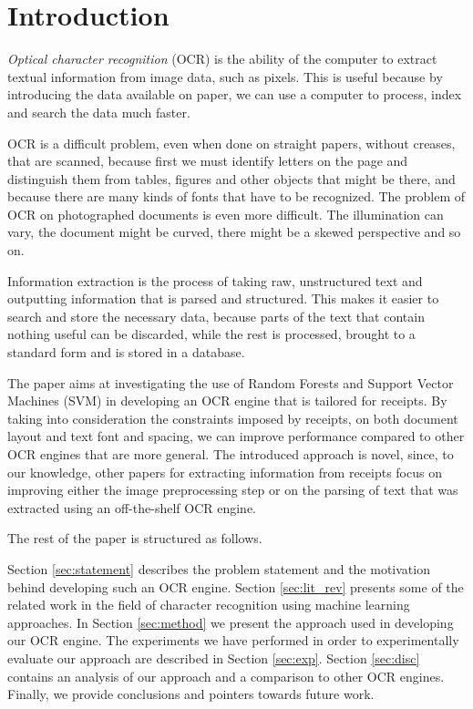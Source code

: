 \section{Introduction}
\textit{Optical character recognition} (OCR) is the ability of the computer to extract textual information from image data, such as pixels\cite{schantz1982history}. This is useful because by introducing the data available on paper, we can use a computer to process, index and search the data much faster.  

OCR is a difficult problem, even when done on straight papers, without creases, that are scanned, because first we must identify letters on the page and distinguish them from tables, figures and other objects that might be there, and because there are many kinds of fonts that have to be recognized. The problem of OCR on photographed documents is even more difficult. The illumination can vary, the document might be curved, there might be a skewed perspective and so on. 

Information extraction is the process of taking raw, unstructured text and outputting information that is parsed and structured. This makes it easier to search and store the necessary data, because parts of the text that contain nothing useful can be discarded, while the rest is processed, brought to a standard form and is stored in a database. 

The paper aims at investigating the use of Random Forests\cite{breiman2001random} and Support Vector Machines (SVM)\cite{Cortes_1995} in developing an OCR engine that is tailored for receipts. By taking into consideration the constraints imposed by receipts, on both document layout and text font and spacing, we can improve performance compared to other OCR engines that are more general. The introduced approach is novel, since, to our knowledge, other papers for extracting information from receipts focus on improving either the image preprocessing step or on the parsing of text that was extracted using an off-the-shelf OCR engine.

The rest of the paper is structured as follows.

Section \ref{sec:statement} describes the problem statement and the motivation behind developing such an OCR engine. Section \ref{sec:lit_rev} presents some of the related work in the field of character recognition using machine learning approaches. In Section \ref{sec:method} we present the approach used in developing our OCR engine. The experiments we have performed in order to experimentally evaluate our approach are described in Section \ref{sec:exp}. Section \ref{sec:disc} contains an analysis of our approach and a comparison to other OCR engines. Finally, we provide conclusions and pointers towards future work. 
